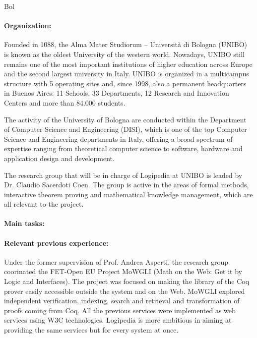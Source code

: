\begin{sitedescription}{Bol}

\paragraph{Organization:}
Founded in 1088, the Alma Mater Studiorum – Università di Bologna (UNIBO) is known as the oldest University of the western world. Nowadays, UNIBO still remains one of the most important institutions of higher education across Europe and the second largest university in Italy. UNIBO is organized in a multicampus structure with 5 operating sites and, since 1998, also a permanent headquarters in Buenos Aires: 11 Schools, 33 Departments, 12 Research and Innovation Centers and more than 84.000 students.

The activity of the University of Bologna are conducted within the Department of Computer Science and Engineering (DISI), which is one of the top Computer Science and Engineering departments in Italy, offering a broad spectrum of expertise ranging from theoretical computer science to software, hardware and application design and development.

The research group that will be in charge of Logipedia at UNIBO is leaded by Dr. Claudio Sacerdoti Coen. The group is active in the areas of formal methods, interactive theorem proving and mathematical knowledge management, which are all relevant to the project.

\paragraph{Main tasks:}

\begin{compactitem}
\item{} 
\end{compactitem}


\paragraph{Relevant previous experience:}

Under the former supervision of Prof. Andrea Asperti, the research group coorinated the FET-Open EU Project MoWGLI (Math on the Web: Get it by Logic and Interfaces). The project was focused on making the library of the Coq prover easily accessible outside the system and on the Web. MoWGLI explored independent verification, indexing, search and retrieval and transformation of proofs coming from Coq. All the previous services were implemented as web services using W3C technologies. Logipedia is more ambitious in aiming at providing the same services but for every system at once.


\end{sitedescription}
